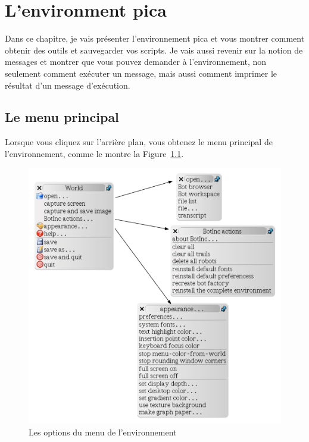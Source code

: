 \documentclass[a4paper,10pt,twoside]{book}
\begin{document}
    \sloppy
\fi

\chapter{L'environment pica}\label{cha:environment}


Dans ce chapitre, je vais pr\'esenter l'environnement pica et  vous montrer comment obtenir des outils et sauvegarder vos scripts. Je vais aussi revenir sur la notion de messages et  montrer que vous pouvez demander \`a l'environnement, non seulement comment ex\'ecuter un message, mais aussi comment imprimer le r\'esultat d'un message d'ex\'ecution. 


\section{Le menu principal }

Lorsque vous cliquez sur l'arri\`ere plan, vous obtenez le menu principal de l'environnement, comme le montre la Figure~\ref{fig:allmenus}.


\begin{figure}[!h]
	\centerline{\includegraphics[width=\textwidth]{allMenu}}
	\caption{Les options du menu de l'environnement\label{fig:allmenus}}
\end{figure}
\end{document}
